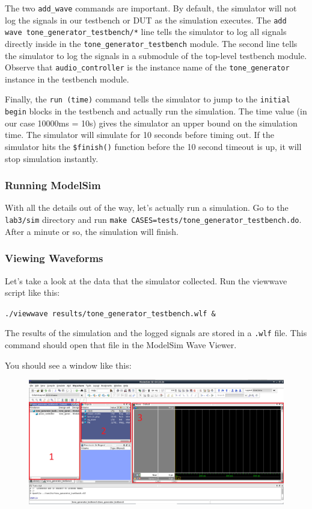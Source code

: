 \documentclass[11pt]{article}
\begin{document}
The two \verb|add_wave| commands are important. By default, the simulator will not log the signals in our testbench or DUT as the simulation executes. The \verb|add wave tone_generator_testbench/*| line tells the simulator to log all signals directly inside in the \verb|tone_generator_testbench| module. The second line tells the simulator to log the signals in a submodule of the top-level testbench module. Observe that \verb|audio_controller| is the instance name of the \verb|tone_generator| instance in the testbench module.

Finally, the \verb|run (time)| command tells the simulator to jump to the \verb|initial begin| blocks in the testbench and actually run the simulation. The time value (in our case 10000ms = 10s) gives the simulator an upper bound on the simulation time. The simulator will simulate for 10 seconds before timing out. If the simulator hits the \verb|$finish()| function before the 10 second timeout is up, it will stop simulation instantly.

\subsubsection{Running ModelSim}

With all the details out of the way, let's actually run a simulation. Go to the \verb|lab3/sim| directory and run \verb|make CASES=tests/tone_generator_testbench.do|. After a minute or so, the simulation will finish.

\subsubsection{Viewing Waveforms}

Let's take a look at the data that the simulator collected. Run the viewwave script like this:

\verb|./viewwave results/tone_generator_testbench.wlf &|

The results of the simulation and the logged signals are stored in a \verb|.wlf| file. This command should open that file in the ModelSim Wave Viewer.

You should see a window like this:

\begin{figure}[H]
	\centerline{\includegraphics[width=\textwidth]{figs/modelsim_new.png}}
\end{figure}
\end{document}
